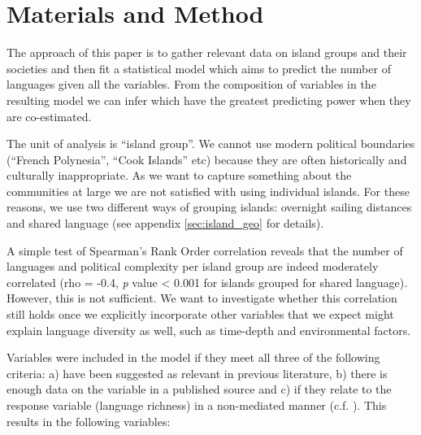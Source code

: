 \documentclass[12pt,letterpaper]{article}
\begin{document}
\FloatBarrier
\section{Materials and Method}
\label{pol_complex_method}
The approach of this paper is to gather relevant data on island groups and their societies and then fit a statistical model which aims to predict the number of languages given all the variables. From the composition of variables in the resulting model we can infer which have the greatest predicting power when they are co-estimated.

The unit of analysis is ``island group''. We cannot use modern political boundaries (``French Polynesia'', ``Cook Islands'' etc) because they are often historically and culturally inappropriate. As we want to capture something about the communities at large we are not satisfied with using individual islands. For these reasons, we use two different ways of grouping islands: overnight sailing distances and shared language (see appendix \ref{sec:island_geo} for details).


A simple test of Spearman's Rank Order correlation reveals that the number of languages and political complexity per island group are indeed moderately correlated (rho  = -0.4, \emph{p} value < 0.001 for islands grouped for shared language). However, this is not sufficient. We want to investigate whether this correlation still holds once we explicitly incorporate other variables that we expect might explain language diversity as well, such as time-depth and environmental factors. 

Variables were included in the model if they meet all three of the following criteria: a) have been suggested as relevant in previous literature, b) there is enough data on the variable in a published source and c) if they relate to the response variable (language richness) in a non-mediated manner (c.f. \citet{pearl1995causal}). This results in the following variables:
\end{document}
